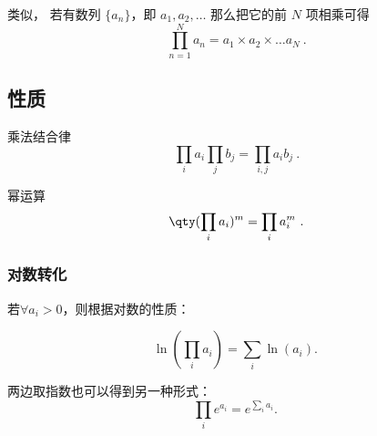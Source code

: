 
\begin{issues}
\issueDraft
\end{issues}

类似， 若有数列 $\{a_n\}$，即 $a_1, a_2, \dots$ 那么把它的前 $N$ 项相乘可得
\begin{equation}
\prod_{n = 1}^N a_n = a_1\times a_2\times \dots a_N~.
\end{equation}

\subsection{性质}
乘法结合律
\begin{equation}
\prod_i a_i \prod_j b_j =  \prod_{i,j} a_i b_j~.
\end{equation}

幂运算
\begin{equation}
\qty(\prod_i a_i)^m =  \prod_i a_i^m~.
\end{equation}

\subsubsection{对数转化}

若$\forall a_i > 0$，则根据对数的性质：

\begin{equation}
\ln \left( \prod_i a_i \right) = \sum_i \ln(a_i).~
\end{equation}

两边取指数也可以得到另一种形式：
\begin{equation}
\prod_i e^{a_i} = e^{\sum_i a_i}.~
\end{equation}


